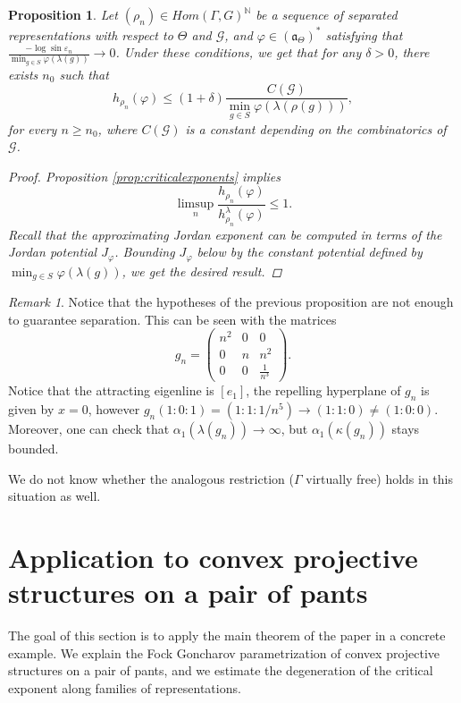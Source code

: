 \documentclass{amsart}
\newtheorem{prop}[thm]{Proposition}
\theoremstyle{remark}
\newtheorem{rmk}[thm]{Remark}
\theoremstyle{definition}
\begin{document}
\begin{prop}
\label{thm:nested}
 Let $(\rho_n) \in Hom (\Gamma ,G)^\mathbb{N}$ be a sequence of separated representations with respect to $\Theta$ and $\mathcal{G}$, and $\varphi \in (\mathfrak{a}_\Theta)^*$ satisfying that $\frac{-\log \sin \varepsilon_n}{\min_{g \in S} \varphi (\lambda (g))} \to 0$.
 Under these conditions, we get that for any $\delta >0$, there exists $n_0$ such that
 $$h_{\rho_n} (\varphi) \leq (1 + \delta) \frac{C(\mathcal{G})}{\min_{g \in S} \varphi (\lambda (\rho (g)))},$$
 for every $n \geq n_0$, where $C(\mathcal{G})$ is a constant depending on the combinatorics of $\mathcal{G}$.
 \begin{proof}
 Proposition \ref{prop:criticalexponents} implies
   $$\limsup_n \frac{h_{\rho_n} (\varphi)}{h_{\rho_n}^\lambda (\varphi)} \leq 1.$$
 Recall that the approximating Jordan exponent can be computed in terms of the Jordan potential $J_\varphi$.
 Bounding $J_\varphi$ below by the constant potential defined by $\min_{g \in S} \varphi (\lambda (g))$, we get the desired result.
 \end{proof}
\end{prop}

\begin{rmk}
 Notice that the hypotheses of the previous proposition are not enough to guarantee separation.
 This can be seen with the matrices
    $$g_n = 
    \begin{pmatrix}
 n^2 & 0 & 0\\
    0 & n & n^2 \\
    0 & 0 & \frac{1}{n^3}
    \end{pmatrix}.$$
 Notice that the attracting eigenline is $[e_1]$, the repelling hyperplane of $g_n$ is given by $x = 0$, however $g_n (1:0:1) = (1:1:1/n^5) \to (1:1:0) \neq (1:0:0)$.
 Moreover, one can check that $\alpha_1 (\lambda (g_n)) \to \infty$, but $\alpha_1 (\kappa (g_n))$ stays bounded. 
\end{rmk}

We do not know whether the analogous restriction ($\Gamma$ virtually free) holds in this situation as well.

\section{Application to convex projective structures on a pair of pants}
\label{sec:sl3}
The goal of this section is to apply the main theorem of the paper in a concrete example. We explain the Fock Goncharov parametrization of convex projective structures on a pair of pants, and we estimate the degeneration of the critical exponent along families of representations.
\end{document}
